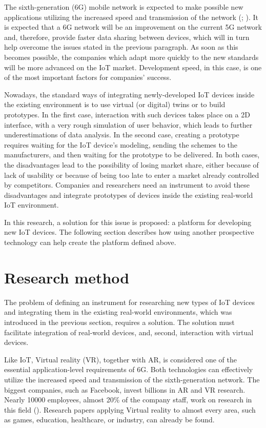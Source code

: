 The sixth-generation (6G) mobile network is expected to make possible new applications utilizing the increased speed and transmission of the network (\cite{huang_survey_2019}; \cite{liao_information-centric_2021}). It is expected that a 6G network will be an improvement on the current 5G network and, therefore, provide faster data sharing between devices, which will in turn help overcome the issues stated in the previous paragraph. As soon as this becomes possible, the companies which adapt more quickly to the new standards will be more advanced on the IoT market. Development speed, in this case, is one of the most important factors for companies' success.

Nowadays, the standard ways of integrating newly-developed IoT devices inside the existing environment is to use virtual (or digital) twins or to build prototypes. In the first case, interaction with such devices takes place on a 2D interface, with a very rough simulation of user behavior, which leads to further underestimations of data analysis. In the second case, creating a prototype requires waiting for the IoT device's modeling, sending the schemes to the manufacturers, and then waiting for the prototype to be delivered. In both cases, the disadvantages lead to the possibility of losing market share, either because of lack of usability or because of being too late to enter a market already controlled by competitors. Companies and researchers need an instrument to avoid these disadvantages and integrate prototypes of devices inside the existing real-world IoT environment.

In this research, a solution for this issue is proposed: a platform for developing new IoT devices. The following section describes how using another prospective technology can help create the platform defined above.

\section{Research method}

The problem of defining an instrument for researching new types of IoT devices and integrating them in the existing real-world environments, which was introduced in the previous section, requires a solution. The solution must facilitate integration of real-world devices, and, second, interaction with virtual devices.

Like IoT, Virtual reality (VR), together with AR, is considered one of the essential application-level requirements of 6G. Both technologies can effectively utilize the increased speed and transmission of the sixth-generation network. The biggest companies, such as Facebook, invest billions in AR and VR research. Nearly 10000 employees, almost 20\% of the company staff, work on research in this field (\cite{sam_byford_almost_2021}). Research papers applying Virtual reality to almost every area, such as games, education, healthcare, or industry, can already be found.


